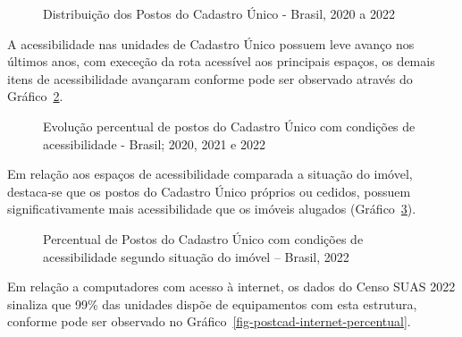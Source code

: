 \documentclass[
  letterpaper,
  DIV=11,
  numbers=noendperiod]{scrreprt}
\begin{document}
\begin{figure}


\caption{\label{fig-posto_cadunico}Distribuição dos Postos do Cadastro
Único - Brasil, 2020 a 2022}

\end{figure}%

A acessibilidade nas unidades de Cadastro Único possuem leve avanço nos
últimos anos, com execeção da rota acessível aos principais espaços, os
demais itens de acessibilidade avançaram conforme pode ser observado
através do Gráfico~\ref{fig-postcad-acessibilidade}.

\begin{figure}


\caption{\label{fig-postcad-acessibilidade}Evolução percentual de postos
do Cadastro Único com condições de acessibilidade - Brasil; 2020, 2021 e
2022}

\end{figure}%

Em relação aos espaços de acessibilidade comparada a situação do imóvel,
destaca-se que os postos do Cadastro Único próprios ou cedidos, possuem
significativamente mais acessibilidade que os imóveis alugados
(Gráfico~\ref{fig-postcad-acessibilidade-situacao}).

\begin{figure}


\caption{\label{fig-postcad-acessibilidade-situacao}Percentual de Postos
do Cadastro Único com condições de acessibilidade segundo situação do
imóvel -- Brasil, 2022}

\end{figure}%

Em relação a computadores com acesso à internet, os dados do Censo SUAS
2022 sinaliza que 99\% das unidades dispõe de equipamentos com esta
estrutura, conforme pode ser observado no
Gráfico~\ref{fig-postcad-internet-percentual}.
\end{document}
